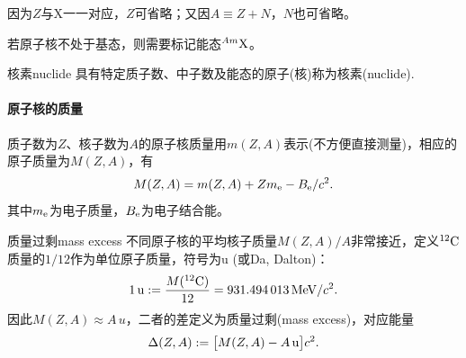 \begin{remark}
	因为$Z$与X一一对应，$Z$可省略；又因$A\equiv Z+N$，$N$也可省略。
\end{remark}

\begin{remark}
	若原子核不处于基态，则需要标记能态$\nucli{Am}X$。
\end{remark}

\begin{definition}{核素}{nuclide}
	具有特定质子数、中子数及能态的原子(核)称为核素(nuclide).
\end{definition}

\paragraph{原子核的质量}质子数为$Z$、核子数为$A$的原子核质量用$m(Z,A)$表示(不方便直接测量)，相应的原子质量为$M(Z,A)$，有
\begin{equation}
	M(Z,A)=m(Z,A)+Zm_\elc-B_\elc/c^2.
\end{equation}
其中$m_\elc$为电子质量，$B_\elc$为电子结合能。

\begin{definition}{质量过剩}{mass excess}
	不同原子核的平均核子质量$M(Z,A)/A$非常接近，定义$\nucli{12}C$质量的$1/12$作为单位原子质量，符号为u (或Da, Dalton)：
	\begin{equation}
		\SI{1}{u}:=\frac{M(\nucli{12}C)}{12}=\SI{931.494013}{MeV}/c^2.
	\end{equation}
	因此$M(Z,A)\approx A\,\si{u}$，二者的差定义为质量过剩(mass excess)，对应能量
	\begin{align}
		\D(Z,A):=\bigfkh{M(Z,A)-A\,\si{u}}c^2.
	\end{align}
\end{definition}
